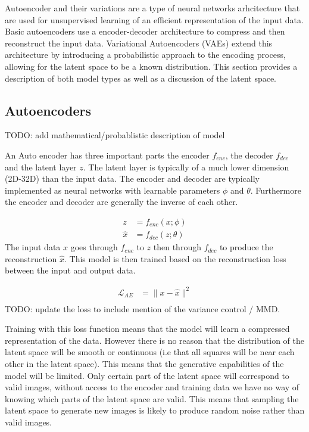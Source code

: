\documentclass[conference,a4paper]{IEEEtran}
\begin{document}
Autoencoder and their variations are a type of neural networks arhcitecture that are used for unsupervised learning of an efficient representation of the input data. Basic autoencoders use a encoder-decoder architecture to compress and then reconstruct the input data. Variational Autoencoders (VAEs) extend this architecture by introducing a probabilistic approach to the encoding process, allowing for the latent space to be a known distribution. This section provides a description of both model types as well as a discussion of the latent space.

\subsection{Autoencoders}

TODO: add mathematical/probablistic description of model

An Auto encoder has three important parts the encoder $f_{enc}$, the decoder $f_{dec}$ and the latent layer $z$. The latent layer is typically of a much lower dimension (2D-32D) than the input data. The encoder and decoder are typically implemented as neural networks with learnable parameters $\phi$ and $\theta$. Furthermore the encoder and decoder are generally the inverse of each other.

\begin{align}
z &= f_{enc}(x; \phi)\\
\hat{x} &= f_{dec}(z; \theta)
\end{align}
The input data $x$ goes through $f_{enc}$ to $z$ then through $f_{dec}$ to produce the reconstruction $\hat{x}$. This model is then trained based on the reconstruction loss between the input and output data.

\begin{align}
\mathcal{L}_{AE} &= \| x - \hat{x} \|^2\\
\end{align}
TODO: update the loss to include mention of the variance control / MMD.

Training with this loss function means that the model will learn a compressed representation of the data. However there is no reason that the distribution of the latent space will be smooth or continuous (i.e that all squares will be near each other in the latent space). This means that the generative capabilities of the model will be limited. Only certain part of the latent space will correspond to valid images, without access to the encoder and training data we have no way of knowing which parts of the latent space are valid. This means that sampling the latent space to generate new images is likely to produce random noise rather than valid images.
\end{document}
